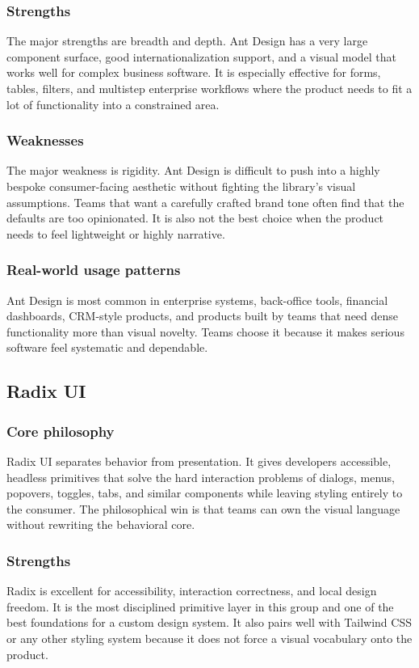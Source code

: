 \documentclass[11pt,twoside,a4paper]{article}
\begin{document}
\subsubsection{Strengths}
The major strengths are breadth and depth. Ant Design has a very large component surface, good internationalization support, and a visual model that works well for complex business software. It is especially effective for forms, tables, filters, and multistep enterprise workflows where the product needs to fit a lot of functionality into a constrained area.

\subsubsection{Weaknesses}
The major weakness is rigidity. Ant Design is difficult to push into a highly bespoke consumer-facing aesthetic without fighting the library's visual assumptions. Teams that want a carefully crafted brand tone often find that the defaults are too opinionated. It is also not the best choice when the product needs to feel lightweight or highly narrative.

\subsubsection{Real-world usage patterns}
Ant Design is most common in enterprise systems, back-office tools, financial dashboards, CRM-style products, and products built by teams that need dense functionality more than visual novelty. Teams choose it because it makes serious software feel systematic and dependable.

\subsection{Radix UI}
\subsubsection{Core philosophy}
Radix UI separates behavior from presentation. It gives developers accessible, headless primitives that solve the hard interaction problems of dialogs, menus, popovers, toggles, tabs, and similar components while leaving styling entirely to the consumer. The philosophical win is that teams can own the visual language without rewriting the behavioral core.

\subsubsection{Strengths}
Radix is excellent for accessibility, interaction correctness, and local design freedom. It is the most disciplined primitive layer in this group and one of the best foundations for a custom design system. It also pairs well with Tailwind CSS or any other styling system because it does not force a visual vocabulary onto the product.
\end{document}
